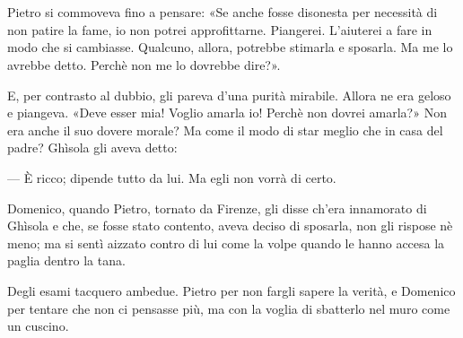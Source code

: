 \chapter{}

Pietro si commoveva fino a pensare: «Se anche fosse disonesta per necessità di non patire la fame, io non potrei approfittarne. Piangerei. L'aiuterei a fare in modo che si cambiasse. Qualcuno, allora, potrebbe stimarla e sposarla. Ma me lo avrebbe detto. Perchè non me lo dovrebbe dire?».

E, per contrasto al dubbio, gli pareva d'una purità mirabile. Allora ne era geloso e piangeva. «Deve esser mia! Voglio amarla io! Perchè non dovrei amarla?» Non era anche il suo dovere morale? Ma come il modo di star meglio che in casa del padre? Ghìsola gli aveva detto:

— È ricco; dipende tutto da lui. Ma egli non vorrà di certo.

Domenico, quando Pietro, tornato da Firenze, gli disse ch'era innamorato di Ghìsola e che, se fosse stato contento, aveva deciso di sposarla, non gli rispose nè meno; ma si sentì aizzato contro di lui come la volpe quando le hanno accesa la paglia dentro la tana.

Degli esami tacquero ambedue. Pietro per non fargli sapere la verità, e Domenico per tentare che non ci pensasse più, ma con la voglia di sbatterlo nel muro come un cuscino.
